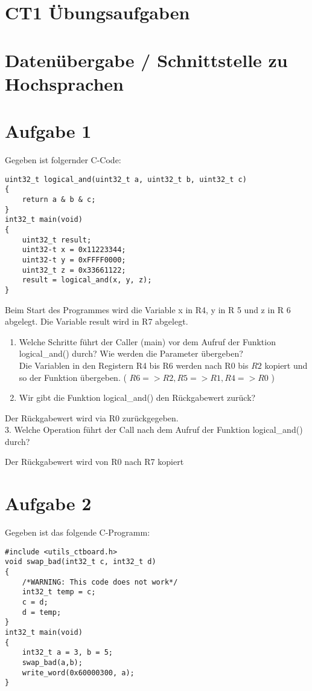 \documentclass[10pt]{article}
\begin{document}
\section*{CT1 Übungsaufgaben}
\section*{Datenübergabe / Schnittstelle zu Hochsprachen}
\section*{Aufgabe 1}
Gegeben ist folgernder C-Code:

\begin{verbatim}
uint32_t logical_and(uint32_t a, uint32_t b, uint32_t c)
{
    return a & b & c;
}
int32_t main(void)
{
    uint32_t result;
    uint32-t x = 0x11223344;
    uint32-t y = 0xFFFF0000;
    uint32_t z = 0x33661122;
    result = logical_and(x, y, z);
}
\end{verbatim}

Beim Start des Programmes wird die Variable x in R4, y in R 5 und z in R 6 abgelegt. Die Variable result wird in R7 abgelegt.

\begin{enumerate}
  \item Welche Schritte führt der Caller (main) vor dem Aufruf der Funktion logical\_and() durch? Wie werden die Parameter übergeben?\\
Die Variablen in den Registern R4 bis R6 werden nach R0 bis $R 2$ kopiert und so der Funktion übergeben. ( $R 6=>R 2, R 5=>R 1, R 4=>R 0$ )\\
$\qquad$
  \item Wir gibt die Funktion logical\_and() den Rückgabewert zurück?
\end{enumerate}

Der Rückgabewert wird via R0 zurückgegeben.\\
3. Welche Operation führt der Call nach dem Aufruf der Funktion logical\_and() durch?

Der Rückgabewert wird von R0 nach R7 kopiert

\section*{Aufgabe 2}
Gegeben ist das folgende C-Programm:

\begin{verbatim}
#include <utils_ctboard.h>
void swap_bad(int32_t c, int32_t d)
{
    /*WARNING: This code does not work*/
    int32_t temp = c;
    c = d;
    d = temp;
}
int32_t main(void)
{
    int32_t a = 3, b = 5;
    swap_bad(a,b);
    write_word(0x60000300, a);
}
\end{verbatim}
\end{document}

